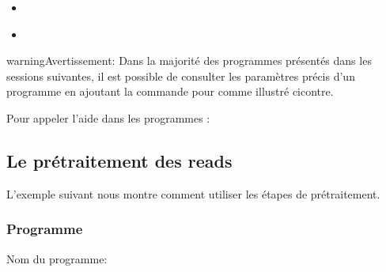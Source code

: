 \documentclass[letterpaper,10pt,french]{sphinxmanual}
\begin{document}
\begin{sphinxShadowBox}
\begin{itemize}
\begin{itemize}
\item {} 
\label{\detokenize{tutorial:id45}}{\hyperref[\detokenize{tutorial:creation-d-une-base-de-donnees-avec-la-suite-blast}]{}}

\item {} 
\label{\detokenize{tutorial:id46}}{\hyperref[\detokenize{tutorial:classification-des-reads-avec-la-suite-blast}]{}}

\end{itemize}

\end{itemize}
\end{sphinxShadowBox}
\label{\detokenize{tutorial:pre-processing}}
\begin{sphinxadmonition}{warning}{Avertissement:}
Dans la majorité des programmes présentés dans les sessions suivantes, il est possible de consulter les paramètres précis d’un programme en ajoutant la commande  pour  comme illustré ci\sphinxhyphen{}contre.
\end{sphinxadmonition}

Pour appeler l’aide dans les programmes :

\begin{sphinxVerbatim}[commandchars=\\\{\}]
 
\end{sphinxVerbatim}


\subsection{Le pré\sphinxhyphen{}traitement des reads}
\label{\detokenize{tutorial:le-pre-traitement-des-reads}}
L’exemple suivant nous montre comment utiliser les étapes de pré\sphinxhyphen{}traitement.


\subsubsection{Programme}
\label{\detokenize{tutorial:programme}}
Nom du programme:

\begin{sphinxVerbatim}[commandchars=\\\{\}]
\end{sphinxVerbatim}
\end{document}

